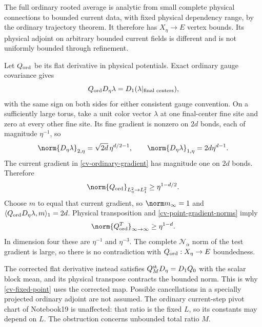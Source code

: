 The full ordinary rooted average is analytic from small
complete physical connections to bounded current data, with
fixed physical dependency range, by the ordinary trajectory
theorem. It therefore has $X_\eta\to E$ vertex bounds.
Its physical adjoint on arbitrary bounded current fields is
different and is not uniformly bounded through refinement.

Let $Q_{\rm ord}$ be its flat derivative in physical
potentials. Exact ordinary gauge covariance gives
\begin{equation}\label{cv-ordinary-gradient}
 Q_{\rm ord}D_\eta\lambda
          =D_1(\lambda|_{\text{final centers}}),
\end{equation}
with the same sign on both sides for either consistent
gauge convention. On a sufficiently large torus, take a
unit color vector $\lambda$ at one final-center fine site
and zero at every other fine site. Its fine gradient is
nonzero on $2d$ bonds, each of magnitude $\eta^{-1}$, so
\begin{equation}\label{cv-point-gradient-norms}
 \norm{D_\eta\lambda}_{2,\eta}
       =\sqrt{2d}\,\eta^{d/2-1},\qquad
 \norm{D_\eta\lambda}_{1,\eta}=2d\eta^{d-1}.
\end{equation}
The current gradient in \eqref{cv-ordinary-gradient} has
magnitude one on $2d$ bonds. Therefore
\begin{equation}\label{cv-ordinary-hilbert-obstruction}
 \norm{Q_{\rm ord}}_{L^2_\eta\to L^2_1}
                     \ge\eta^{1-d/2}.
\end{equation}
Choose $m$ to equal that current gradient, so
$\norm m_\infty=1$ and
$\langle Q_{\rm ord}D_\eta\lambda,m\rangle_1=2d$.
Physical transposition and
\eqref{cv-point-gradient-norms} imply
\begin{equation}\label{cv-ordinary-adjoint-obstruction}
 \norm{Q_{\rm ord}^T}_{\infty\to\infty}\ge\eta^{1-d}.
\end{equation}
In dimension four these are $\eta^{-1}$ and $\eta^{-3}$.
The complete $\mathcal N_\alpha$ norm of the test gradient
is large, so there is no contradiction with
$Q_{\rm ord}:X_\eta\to E$ boundedness.

The corrected flat derivative instead satisfies
$Q_M^{\rm st}D_\eta=D_1Q_0$ with the scalar block mean,
and its physical transpose contracts the bounded norm.
This is why \eqref{cv-fixed-point} uses the corrected map.
Possible cancellations in a specially projected ordinary
adjoint are not assumed. The ordinary current-step pivot
chart of Notebook19 is unaffected: that ratio is the fixed
$L$, so its constants may depend on $L$. The obstruction
concerns unbounded total ratio $M$.

